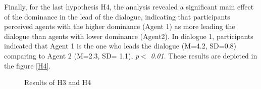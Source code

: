 \documentclass{llncs}
\begin{document}
				\par Finally, for the last hypothesis H4, the analysis revealed a significant main effect of the dominance in the lead of the dialogue, indicating that participants perceived agents with the higher dominance (Agent 1) as more leading the dialogue than agents with lower dominance (Agent2). In dialogue 1, participants indicated that Agent 1 is the one who leads the dialogue (M=4.2, SD=0.8) comparing to Agent 2 (M=2.3, SD= 1.1), \textit{p$<$ 0.01}. These results are depicted in the figure \ref{H4}.
				
			\begin{figure}[htb!]
				\setlength\fboxsep{0pt}\setlength\fboxrule{0.75pt}
				{
					\caption{Results of H3 and H4}

				}
			\end{figure}%
\end{document}
